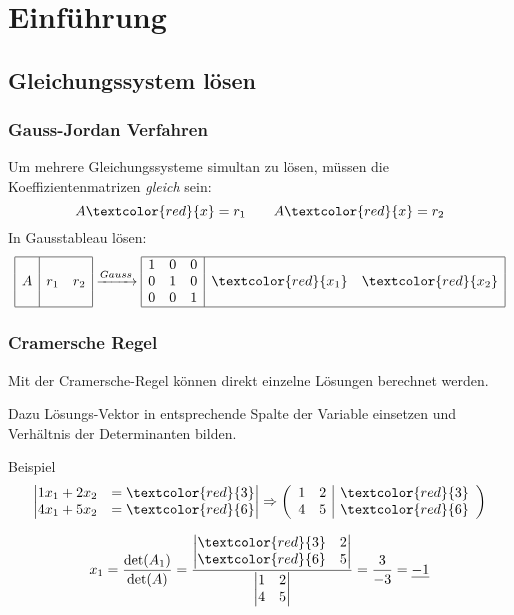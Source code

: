 \section{Einführung}
\subsection{Gleichungssystem lösen}
\subsubsection{Gauss-Jordan Verfahren}\label{gaussjordan}
Um mehrere Gleichungssysteme simultan zu lösen, müssen die Koeffizientenmatrizen \textit{gleich} sein:
\[A\textcolor{red}{x} = r_1 \qquad A\textcolor{red}{x} = r_2\]
In Gausstableau lösen:
\[
\begin{array}{|c|cc|}
	\hline
	  & &  \\
    A & r_1 & r_2 \\
      & &   \\
	\hline
\end{array}
\xrightarrow{Gauss}
\begin{array}{|ccc|cc|}
	\hline
	1 & 0 & 0 & & \\
	0 & 1 & 0 & \textcolor{red}{x_1} & \textcolor{red}{x_2} \\
	0 & 0 & 1 &  & \\
	\hline
\end{array}
\]

\subsubsection{Cramersche Regel}
Mit der Cramersche-Regel können direkt einzelne Lösungen berechnet werden.

\noindent Dazu Lösungs-Vektor in entsprechende Spalte der Variable einsetzen und Verhältnis der Determinanten bilden.

\noindent Beispiel
\[
	\begin{vmatrix}
		1x_1 + 2x_2 &= \textcolor{red}{3} \\
		4x_1 + 5x_2 &= \textcolor{red}{6}
	\end{vmatrix} \Rightarrow
	\left(\begin{array}{cc|c}
		1 & 2 & \textcolor{red}{3} \\
		4 & 5 & \textcolor{red}{6} 
	\end{array}\right)
\]

\[
	x_1 = \frac{\det(A_1)}{\det(A)} = \frac{
			\begin{vmatrix}
				\textcolor{red}{3} & 2 \\
				\textcolor{red}{6} & 5
			\end{vmatrix}
		  }{
  			  \begin{vmatrix}
			  	1 & 2 \\
			  	4 & 5
			  \end{vmatrix}
	      }
       =
       \frac{3}{-3}
       = \underline{-1}
\]


